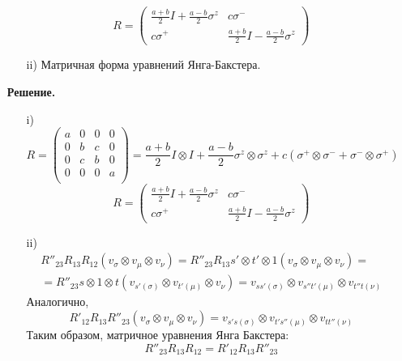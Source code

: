 \documentclass[12pt]{article}
\theoremstyle{definition}
\begin{document}
\begin{enumerate}
\begin{itemize}
        \begin{equation}
            R=\begin{pmatrix}
                \frac{a+b}{2}I+\frac{a-b}{2}\sigma^z & c\sigma^-\\
                c\sigma^+ & \frac{a+b}{2}I-\frac{a-b}{2}\sigma^z
            \end{pmatrix}
        \end{equation}
        \item[ii)] Матричная форма уравнений Янга-Бакстера.
    \end{itemize}
    \textbf{Решение.}
    \begin{itemize}
        \item[i)]
        \begin{equation}
            R=\begin{pmatrix}
                a & 0 & 0 & 0\\
                0 & b & c & 0\\
                0 & c & b & 0\\
                0 & 0 & 0 & a\\
            \end{pmatrix}=\frac{a+b}{2}I\otimes I+\frac{a-b}{2}\sigma^z\otimes\sigma^z+c(\sigma^+\otimes\sigma^-+\sigma^-\otimes\sigma^+)
        \end{equation}
        \begin{equation}
             R=\begin{pmatrix}
                \frac{a+b}{2}I+\frac{a-b}{2}\sigma^z & c\sigma^-\\
                c\sigma^+ & \frac{a+b}{2}I-\frac{a-b}{2}\sigma^z
            \end{pmatrix}
        \end{equation}
        \item[ii)]
        \begin{multline}
            R''_{23}R_{13}R_{12}(v_\sigma\otimes v_\mu\otimes v_\nu)=R''_{23}R_{13}s'\otimes t'\otimes1(v_\sigma\otimes v_\mu\otimes v_\nu)=\\=R''_{23}s\otimes1\otimes t(v_{s'(\sigma)}\otimes v_{t'(\mu)}\otimes v_\nu)=v_{ss'(\sigma)}\otimes v_{s''t'(\mu)}\otimes v_{t''t(\nu)}
        \end{multline}
        Аналогично,
        \begin{equation}
            R'_{12}R_{13}R''_{23}(v_\sigma\otimes v_\mu\otimes v_\nu)=v_{s's(\sigma)}\otimes v_{t's''(\mu)}\otimes v_{tt''(\nu)}
        \end{equation}
        Таким образом, матричное уравнения Янга Бакстера:
        \begin{equation}
            \boxed{R''_{23}R_{13}R_{12}=R'_{12}R_{13}R''_{23}}
        \end{equation}
    \end{itemize}
\end{enumerate}
\end{document}
